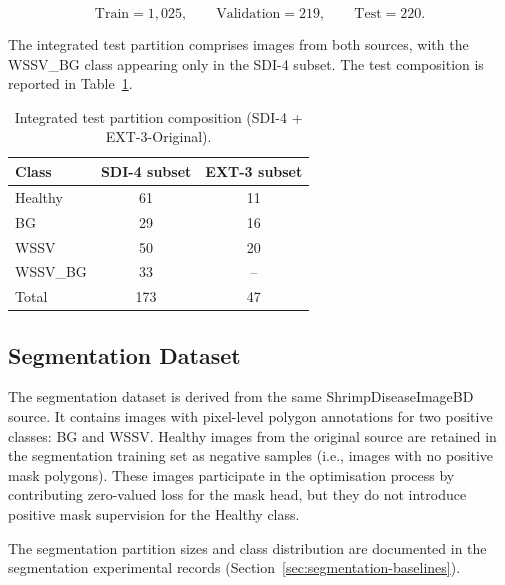 \[
\text{Train} = 1,025, \qquad
\text{Validation} = 219, \qquad
\text{Test} = 220.
\]

The integrated test partition comprises images from both sources, with the WSSV\_BG class appearing only in the SDI-4 subset. The test composition is reported in Table~\ref{tab:integrated-test}.

\begin{table}[htbp]
\centering
\caption{Integrated test partition composition (SDI-4 + EXT-3-Original).}
\label{tab:integrated-test}
\begin{tabular}{l c c}
\toprule
\textbf{Class} & \textbf{SDI-4 subset} & \textbf{EXT-3 subset} \\
\midrule
Healthy  & 61 &  11 \\
BG       & 29 &  16 \\
WSSV     & 50 &  20 \\
WSSV\_BG & 33 &  -- \\
\midrule
Total    & 173 & 47 \\
\bottomrule
\end{tabular}
\end{table}

\subsection{Segmentation Dataset}
\label{sec:segmentation-dataset}

The segmentation dataset is derived from the same ShrimpDiseaseImageBD source. It contains images with pixel-level polygon annotations for two positive classes: BG and WSSV. Healthy images from the original source are retained in the segmentation training set as negative samples (i.e., images with no positive mask polygons). These images participate in the optimisation process by contributing zero-valued loss for the mask head, but they do not introduce positive mask supervision for the Healthy class.

The segmentation partition sizes and class distribution are documented in the segmentation experimental records (Section~\ref{sec:segmentation-baselines}).